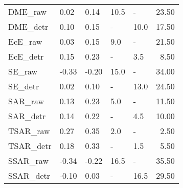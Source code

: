 \begin{tabular}{lllllr}
\midrule
DME\_raw & 0.02 & 0.14 & 10.5 & - & 23.50 \\
DME\_detr & 0.10 & 0.15 & - & 10.0 & 17.50 \\
\midrule
EcE\_raw & 0.03 & 0.15 & 9.0 & - & 21.50 \\
EcE\_detr & 0.15 & 0.23 & - & 3.5 & 8.50 \\
\midrule
SE\_raw & -0.33 & -0.20 & 15.0 & - & 34.00 \\
SE\_detr & 0.02 & 0.10 & - & 13.0 & 24.50 \\
\midrule
SAR\_raw & 0.13 & 0.23 & 5.0 & - & 11.50 \\
SAR\_detr & 0.14 & 0.22 & - & 4.5 & 10.00 \\
\midrule
TSAR\_raw & 0.27 & 0.35 & 2.0 & - & 2.50 \\
TSAR\_detr & 0.18 & 0.33 & - & 1.5 & 5.50 \\
\midrule
SSAR\_raw & -0.34 & -0.22 & 16.5 & - & 35.50 \\
SSAR\_detr & -0.10 & 0.03 & - & 16.5 & 29.50 \\
\midrule
\bottomrule
\end{tabular}
\midrule
